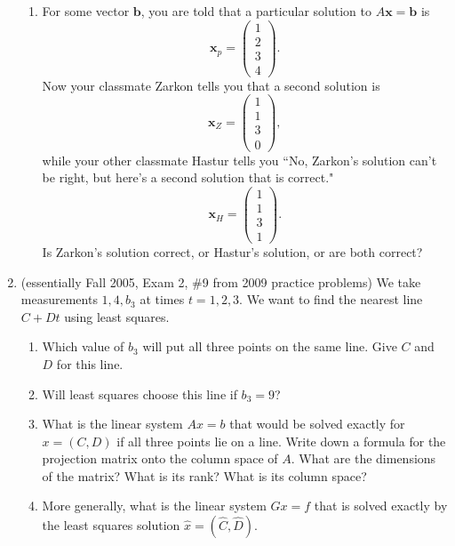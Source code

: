 \documentclass[11pt]{article}
\begin{document}
\begin{enumerate}
\begin{enumerate}
\item For some vector $\mathbf{b}$, you are told that a particular solution to $A \mathbf{x} = \mathbf{b}$ is
\[\mathbf{x}_p = \begin{pmatrix} 1 \\ 2 \\ 3 \\ 4 \end{pmatrix}. \]
Now your classmate Zarkon tells you that a second solution is
\[\mathbf{x}_Z = \begin{pmatrix} 1 \\ 1 \\ 3 \\ 0 \end{pmatrix},\]
while your other classmate Hastur tells you ``No, Zarkon's solution can't be right, but here's a second solution that is correct."
\[\mathbf{x}_H = \begin{pmatrix} 1 \\ 1 \\ 3 \\ 1 \end{pmatrix}.\]
Is Zarkon's solution correct, or Hastur's solution, or are both correct?

\end{enumerate}

\item (essentially Fall 2005, Exam 2, \#9 from 2009 practice problems)  We take measurements $1,4,b_3$ at times $t = 1,2,3$.  We want to find the nearest line $C + Dt$ using least squares.
\begin{enumerate}

\item Which value of $b_3$ will put all three points on the same line.  Give $C$ and $D$ for this line.

\item Will least squares choose this line if $b_3 = 9$?  

\item What is the linear system $Ax = b$ that would be solved exactly for $x = (C, D)$ if all three points lie on a line.  Write down a formula for the projection matrix onto the column space of $A$.  What are the dimensions of the matrix?  What is its rank?  What is its column space?

\item More generally, what is the linear system $Gx = f$ that is solved exactly by the least squares solution $\hat{x} = (\hat{C}, \hat{D})$.

\end{enumerate}


\end{enumerate}
\end{document}
